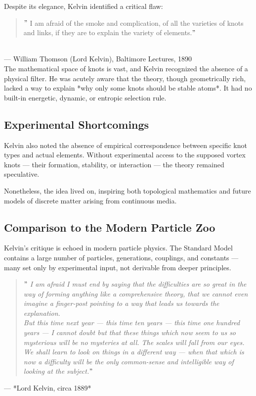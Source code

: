    Despite its elegance, Kelvin identified a critical flaw:

   \begin{quote}
   \("\) I am afraid of the smoke and complication, of all the varieties of knots and links, if they are to explain the variety of elements.\("\)
   \end{quote}\\
    \hfill — William Thomson (Lord Kelvin), Baltimore Lectures, 1890\\
   The mathematical space of knots is vast, and Kelvin recognized the absence of a physical filter. He was acutely aware that the theory, though geometrically rich, lacked a way to explain *why only some knots should be stable atoms*. It had no built-in energetic, dynamic, or entropic selection rule.

   \subsection*{Experimental Shortcomings}

   Kelvin also noted the absence of empirical correspondence between specific knot types and actual elements. Without experimental access to the supposed vortex knots — their formation, stability, or interaction — the theory remained speculative.

   Nonetheless, the idea lived on, inspiring both topological mathematics and future models of discrete matter arising from continuous media.

   \subsection*{Comparison to the Modern Particle Zoo}

   Kelvin's critique is echoed in modern particle physics. The Standard Model contains a large number of particles, generations, couplings, and constants — many set only by experimental input, not derivable from deeper principles.

   \begin{quote}
   \textit{\("\) I am afraid I must end by saying that the difficulties are so great in the way of forming anything like a comprehensive theory, that we cannot even imagine a finger-post pointing to a way that leads us towards the explanation.} \\
   \textit{But this time next year — this time ten years — this time one hundred years — I cannot doubt but that these things which now seem to us so mysterious will be no mysteries at all. The scales will fall from our eyes. We shall learn to look on things in a different way — when that which is now a difficulty will be the only common-sense and intelligible way of looking at the subject.\("\)}
   \end{quote}
   \hfill — *Lord Kelvin, circa 1889*

